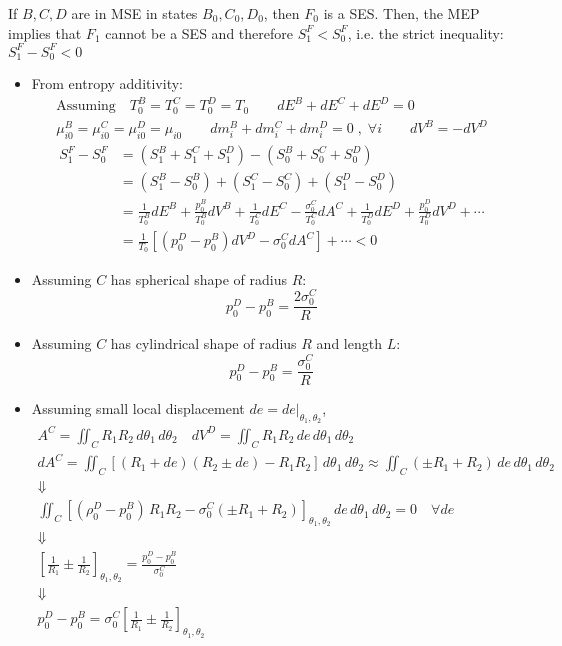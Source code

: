 \begin{example}
    If \( B, C, D \) are in MSE in states \( B_0, C_0, D_0 \), then \( F_0 \) is a SES. 
    Then, the MEP implies that \( F_1 \) cannot be a SES and therefore \( S^F_1 < S^F_0 \), 
    i.e. the strict inequality:
    \(
    S^F_1 - S^F_0 < 0
    \)
\begin{itemize}
    \item From entropy additivity:
    \begin{gather*}
        \text{Assuming}\quad T_0^B = T_0^C = T_0^D = T_0 \qquad dE^B + dE^C + dE^D = 0 \\
        \mu_{i0}^B = \mu_{i0}^C = \mu_{i0}^D = \mu_{i0} \qquad 
        dm_i^B + dm_i^C + dm_i^D = 0 \;,\; \forall i \qquad
        dV^B = -dV^D
    \end{gather*}
\begin{align*}
        S^F_1 - S^F_0 &= (S^B_1 + S^C_1 + S^D_1) - (S^B_0 + S^C_0 + S^D_0) \\
        &= (S^B_1 - S^B_0) + (S^C_1 - S^C_0) + (S^D_1 - S^D_0)\\
        &= \frac{1}{T^B_0} dE^B + \frac{p^B_0}{T^B_0} dV^B 
        + \frac{1}{T^C_0} dE^C - \frac{\sigma^C_0}{T^C_0} dA^C 
        + \frac{1}{T^D_0} dE^D + \frac{p^D_0}{T^D_0} dV^D +\cdots \\
        &= \frac{1}{T_0} \left[ (p^D_0 - p^B_0) dV^D - \sigma^C_0 dA^C \right] + \cdots < 0
\end{align*}
    \item Assuming \( C \) has spherical shape of radius \( R \):
    \[
    p^D_0 - p^B_0 = \frac{2\sigma^C_0}{R}
    \]
    \item Assuming \( C \) has cylindrical shape of radius \( R \) and length \( L \):
    \[
    p^D_0 - p^B_0 = \frac{\sigma^C_0}{R}
    \]
    \item Assuming small local displacement \( de = de|_{\theta_1,\theta_2} \),
\begin{gather*}
        A^C = \iint_C R_1R_2 \, d\theta_1 \, d\theta_2 \quad dV^D 
        = \iint_C R_1R_2 \, de \, d\theta_1 \, d\theta_2\\
        dA^C = \iint_C [(R_1 + de)(R_2 \pm de) - R_1R_2] \, d\theta_1 \, d\theta_2 
        \approx \iint_C (\pm R_1 + R_2) \, de \, d\theta_1 \, d\theta_2\\
        \Downarrow\\
        \iint_C [(\rho_0^D - p_0^B) \, R_1R_2 - \sigma_0^C (\pm R_1 + R_2)]_{\theta_1,\theta_2} \, de 
        \, d\theta_1 \, d\theta_2 = 0 \quad \forall de\\
        \Downarrow\\
\left[ \frac{1}{R_1} \pm \frac{1}{R_2} \right]_{\theta_1, \theta_2} = \frac{p_0^D - p_0^B}{\sigma_0^C}
\\ \Downarrow\\
        p_0^D - p_0^B = 
        \sigma_0^C \left[ \frac{1}{R_1} \pm \frac{1}{R_2} \right]_{\theta_1, \theta_2}
\end{gather*}
\end{itemize}
\end{example}
